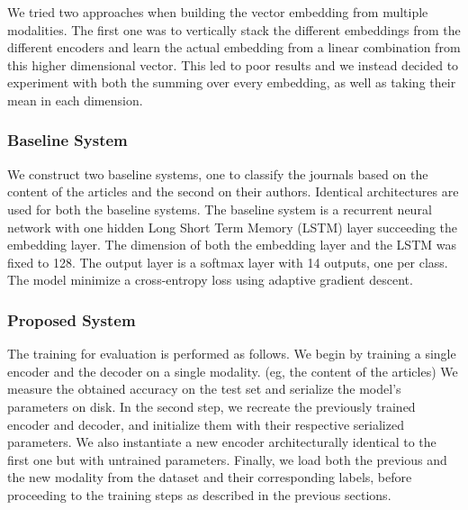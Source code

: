 \documentclass[12pt]{article}
\begin{document}
We tried two approaches when building the vector embedding from multiple modalities. The first one was to vertically stack the different embeddings from the different encoders and learn the actual embedding from a linear combination from this higher dimensional vector. This led to poor results and we instead decided to experiment with both the summing over every embedding, as well as taking their mean in each dimension.


\subsubsection{Baseline System}
We construct two baseline systems, one to classify the journals based on the
content of the articles and the second on their authors. Identical architectures are used for both the baseline
systems. The baseline system is a recurrent neural network with one hidden Long Short Term Memory (LSTM) layer succeeding the embedding layer. The dimension of both the embedding layer and the LSTM was fixed to 128. The output layer is a softmax layer with 14 outputs, one per class. The model minimize a cross-entropy loss using adaptive gradient descent. \cite{duchi2011adaptive}

\subsubsection{Proposed System}
The training for evaluation is performed as follows. We begin by training a single encoder and the decoder on a single modality.
(eg, the content of the articles) We measure the obtained accuracy on the test set and serialize the model's parameters on disk. In the second step, we recreate the previously trained encoder and decoder, and initialize them with their respective serialized parameters. We also instantiate a new encoder architecturally identical to the first one but with untrained parameters. Finally, we load both the previous and the new modality from the dataset and their corresponding labels, before proceeding to the training steps as described in the previous sections.
\end{document}
